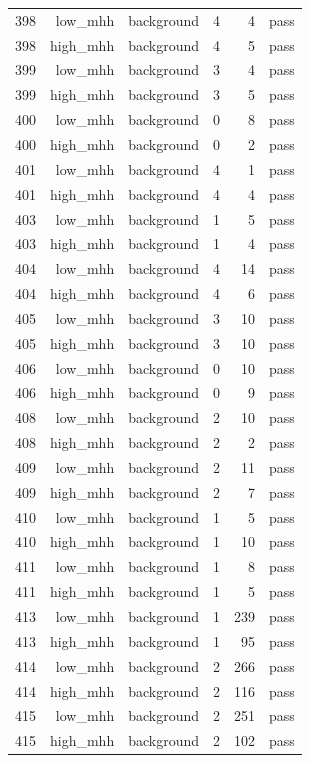 \begin{table}[htbp]
{\begin{tabular}{lrrrrr}
398 & low\_mhh & background & 4 & 4 & pass \\
398 & high\_mhh & background & 4 & 5 & pass \\
399 & low\_mhh & background & 3 & 4 & pass \\
399 & high\_mhh & background & 3 & 5 & pass \\
400 & low\_mhh & background & 0 & 8 & pass \\
400 & high\_mhh & background & 0 & 2 & pass \\
401 & low\_mhh & background & 4 & 1 & pass \\
401 & high\_mhh & background & 4 & 4 & pass \\
403 & low\_mhh & background & 1 & 5 & pass \\
403 & high\_mhh & background & 1 & 4 & pass \\
404 & low\_mhh & background & 4 & 14 & pass \\
404 & high\_mhh & background & 4 & 6 & pass \\
405 & low\_mhh & background & 3 & 10 & pass \\
405 & high\_mhh & background & 3 & 10 & pass \\
406 & low\_mhh & background & 0 & 10 & pass \\
406 & high\_mhh & background & 0 & 9 & pass \\
408 & low\_mhh & background & 2 & 10 & pass \\
408 & high\_mhh & background & 2 & 2 & pass \\
409 & low\_mhh & background & 2 & 11 & pass \\
409 & high\_mhh & background & 2 & 7 & pass \\
410 & low\_mhh & background & 1 & 5 & pass \\
410 & high\_mhh & background & 1 & 10 & pass \\
411 & low\_mhh & background & 1 & 8 & pass \\
411 & high\_mhh & background & 1 & 5 & pass \\
413 & low\_mhh & background & 1 & 239 & pass \\
413 & high\_mhh & background & 1 & 95 & pass \\
414 & low\_mhh & background & 2 & 266 & pass \\
414 & high\_mhh & background & 2 & 116 & pass \\
415 & low\_mhh & background & 2 & 251 & pass \\
415 & high\_mhh & background & 2 & 102 & pass \\

\end{tabular}}
\end{table}
